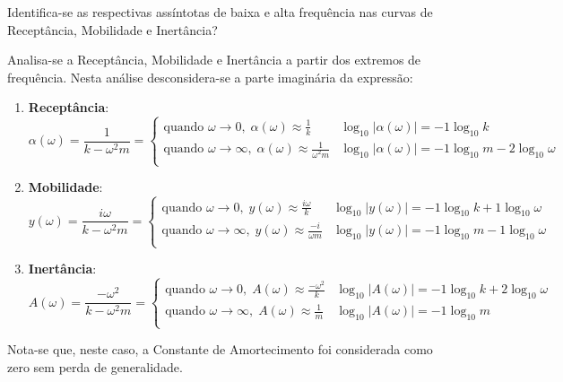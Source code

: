 \documentclass{article}
\begin{document}
\newpage
\begin{exercise}\label{ex5}
    Identifica-se as respectivas assíntotas de baixa e alta frequência nas curvas de Receptância, Mobilidade e Inertância?
\end{exercise}
\begin{resolution}
    Analisa-se a Receptância, Mobilidade e Inertância a partir dos extremos de frequência. Nesta análise desconsidera-se a parte imaginária da expressão:
    \begin{enumerate}
        \item \textbf{Receptância}:
        \begin{equation}
            \alpha(\omega) = \frac{1}{k - \omega^2m} = 
            \begin{cases}\nonumber
                \text{quando } \omega\to 0,     \;\alpha(\omega) \approx \frac{1}{k}         & \log_{10} |\alpha(\omega)| = -1\log_{10} k\\
                \text{quando } \omega\to \infty,\;\alpha(\omega) \approx \frac{1}{\omega^2m} & \log_{10} |\alpha(\omega)| = -1\log_{10} m -2\log_{10} \omega\\
            \end{cases}
        \end{equation}

        \item \textbf{Mobilidade}:
        \begin{equation}
            y(\omega) = \frac{i\omega}{k - \omega^2m} = 
            \begin{cases}\nonumber
                \text{quando } \omega\to 0,     \;y(\omega) \approx \frac{i\omega}{k}   & \log_{10} |y(\omega)| = -1\log_{10} k +1\log_{10} \omega \\
                \text{quando } \omega\to \infty,\;y(\omega) \approx \frac{-i}{\omega m} & \log_{10} |y(\omega)| = -1\log_{10} m -1\log_{10} \omega\\
            \end{cases}
        \end{equation}

        \item \textbf{Inertância}:
        \begin{equation}
            A(\omega) = \frac{-\omega^2}{k - \omega^2m} = 
            \begin{cases}\nonumber
                \text{quando } \omega\to 0,     \;A(\omega) \approx \frac{-\omega^2}{k} & \log_{10} |A(\omega)| = -1\log_{10} k +2\log_{10} \omega\\
                \text{quando } \omega\to \infty,\;A(\omega) \approx \frac{1}{m}         & \log_{10} |A(\omega)| = -1\log_{10} m\\
            \end{cases}
        \end{equation}
    \end{enumerate}
    Nota-se que, neste caso, a Constante de Amortecimento foi considerada como zero sem perda de generalidade.\\


\end{resolution}
\end{document}
